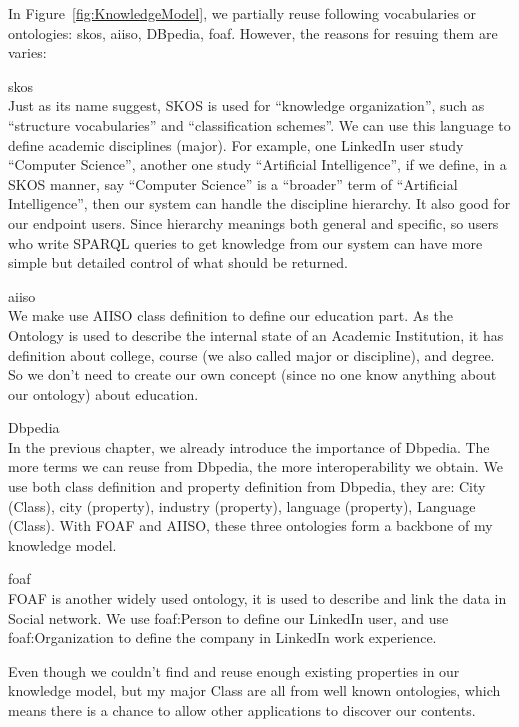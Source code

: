 In Figure~\ref{fig:KnowledgeModel}, we partially reuse following vocabularies or ontologies: \gls{skos}, \gls{aiiso}, DBpedia, \gls{foaf}. However, the reasons for resuing them are varies:
\begin{description}
	\item \gls{skos} \hfill \\
	Just as its name suggest, SKOS is used for ``knowledge organization'', such as ``structure vocabularies'' and ``classification schemes''\cite{miles2007skos}. We can use this language to define academic disciplines (major). For example, one LinkedIn user study ``Computer Science'', another one study ``Artificial Intelligence'', if we define, in a SKOS manner, say ``Computer Science'' is a ``broader'' term of ``Artificial Intelligence'', then our system can handle the discipline hierarchy. It also good for our endpoint users. Since hierarchy meanings both general and specific, so users who write SPARQL queries to get knowledge from our system can have more simple but detailed control of what should be returned.
	\item \gls{aiiso} \hfill \\
	We make use AIISO class definition to define our education part. As the Ontology is used to describe the internal state of an Academic Institution, it has definition about college, course (we also called major or discipline), and degree. So we don't need to create our own concept (since no one know anything about our ontology) about education.
	\item Dbpedia \hfill \\
	In the previous chapter, we already introduce the importance of Dbpedia. The more terms we can reuse from Dbpedia, the more interoperability we obtain. We use both class definition and property definition from Dbpedia, they are: City (Class), city (property), industry (property), language (property), Language (Class). With FOAF and AIISO, these three ontologies form a backbone of my knowledge model.
	\item \gls{foaf} \hfill \\
	FOAF is another widely used ontology, it is used to describe and link the data in Social network\cite{golbeck2008linking}. We use foaf:Person to define our LinkedIn user, and use foaf:Organization to define the company in LinkedIn work experience.
\end{description}

Even though we couldn't find and reuse enough existing properties in our knowledge model, but my major Class are all from well known ontologies, which means there is a chance to allow other applications to discover our contents.

